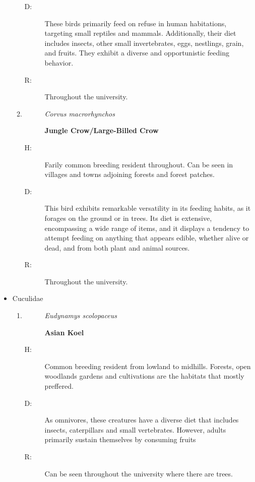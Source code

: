\begin{itemize}
\begin{enumerate}
\begin{description}
\item[D: ]%
These birds primarily feed on refuse in human habitations, targeting small reptiles and mammals. Additionally, their diet includes insects, other small invertebrates, eggs, nestlings, grain, and fruits. They exhibit a diverse and opportunistic feeding behavior.%
\item[R: ]%
Throughout the university. %
\end{description}%
\item%
\begin{description}%
\item[]%
\textit{Corvus macrorhynchos}%
\item[]%
\textbf{Jungle Crow/Large{-}Billed Crow}%
\end{description}%
\begin{description}%
\item[H: ]%
Farily common breeding resident throughout. Can be seen in villages and towns adjoining forests and forest patches.%
\item[D: ]%
This bird exhibits remarkable versatility in its feeding habits, as it forages on the ground or in trees. Its diet is extensive, encompassing a wide range of items, and it displays a tendency to attempt feeding on anything that appears edible, whether alive or dead, and from both plant and animal sources.%
\item[R: ]%
Throughout the university. %
\end{description}%
\end{enumerate}%
\item%
Cuculidae%
\begin{enumerate}%
\item%
\begin{description}%
\item[]%
\textit{Eudynamys scolopaceus}%
\item[]%
\textbf{Asian Koel}%
\end{description}%
\begin{description}%
\item[H: ]%
Common breeding resident from lowland to midhills. Forests, open woodlands gardens and cultivations are the habitats that mostly preffered.%
\item[D: ]%
As omnivores, these creatures have a diverse diet that includes insects, caterpillars and small vertebrates. However, adults primarily sustain themselves by consuming fruits%
\item[R: ]%
Can be seen throughout the university where there are trees.%

\end{description}
\end{enumerate}
\end{itemize}
